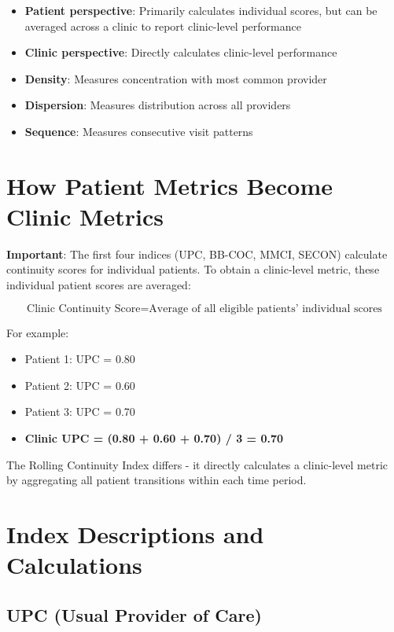 \documentclass[11pt,a4paper]{article}
\begin{document}
\begin{itemize}
\item \textbf{Patient perspective}: Primarily calculates individual scores, but can be averaged across a clinic to report clinic-level performance
\item \textbf{Clinic perspective}: Directly calculates clinic-level performance
\item \textbf{Density}: Measures concentration with most common provider
\item \textbf{Dispersion}: Measures distribution across all providers
\item \textbf{Sequence}: Measures consecutive visit patterns
\end{itemize}

\section{How Patient Metrics Become Clinic Metrics}

\textbf{Important}: The first four indices (UPC, BB-COC, MMCI, SECON) calculate continuity scores for individual patients. To obtain a clinic-level metric, these individual patient scores are averaged:

\begin{equation}
\text{Clinic Continuity Score} = \text{Average of all eligible patients' individual scores}
\end{equation}

For example:
\begin{itemize}
\item Patient 1: UPC = 0.80
\item Patient 2: UPC = 0.60
\item Patient 3: UPC = 0.70
\item \textbf{Clinic UPC = (0.80 + 0.60 + 0.70) / 3 = 0.70}
\end{itemize}

The Rolling Continuity Index differs - it directly calculates a clinic-level metric by aggregating all patient transitions within each time period.

\section{Index Descriptions and Calculations}

\subsection{UPC (Usual Provider of Care)}
\end{document}
